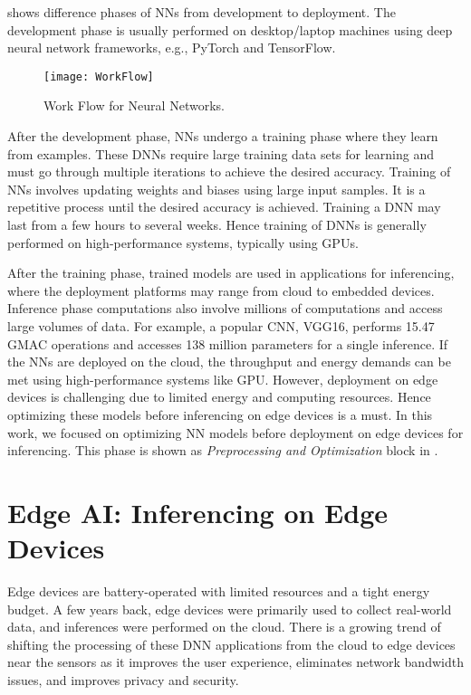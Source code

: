  shows difference phases of NNs from development to deployment. The development phase is usually performed on desktop/laptop machines using deep neural network frameworks, e.g., PyTorch and TensorFlow. 
\begin{figure}[!htb]
	\centering
	\captionsetup{font=sf}
	\texttt{[image: WorkFlow]}
	\caption{Work Flow for Neural Networks.}
	\label{fig:workFlow}
\end{figure}
After the development phase, NNs undergo a training phase where they learn from examples. These DNNs require large training data sets for learning and must go through multiple iterations to achieve the desired accuracy. Training of NNs involves updating weights and biases using large input samples. It is a repetitive process until the desired accuracy is achieved. Training a DNN may last from a few hours to several weeks. Hence training of DNNs is generally performed on high-performance systems, typically using GPUs. 

After the training phase, trained models are used in applications for inferencing, where the deployment platforms may range from cloud to embedded devices. Inference phase computations also involve millions of computations and access large volumes of data. For example, a popular CNN, VGG16, performs 15.47 GMAC operations and accesses 138 million parameters for a single inference. If the NNs are deployed on the cloud, the throughput and energy demands can be met using high-performance systems like GPU. However,  deployment on edge devices is challenging due to limited energy and computing resources. Hence optimizing these models before inferencing on edge devices is a must. In this work, we focused on optimizing NN models before deployment on edge devices for inferencing. This phase is shown as \emph{Preprocessing and Optimization} block in .

\section{Edge AI: Inferencing on Edge Devices}
Edge devices are battery-operated with limited resources and a tight energy budget. A few years back, edge devices were primarily used to collect real-world data, and inferences were performed on the cloud. There is a growing trend of shifting the processing of these DNN applications from the cloud to edge devices near the sensors as it improves the user experience, eliminates network bandwidth issues, and improves privacy and security. 

